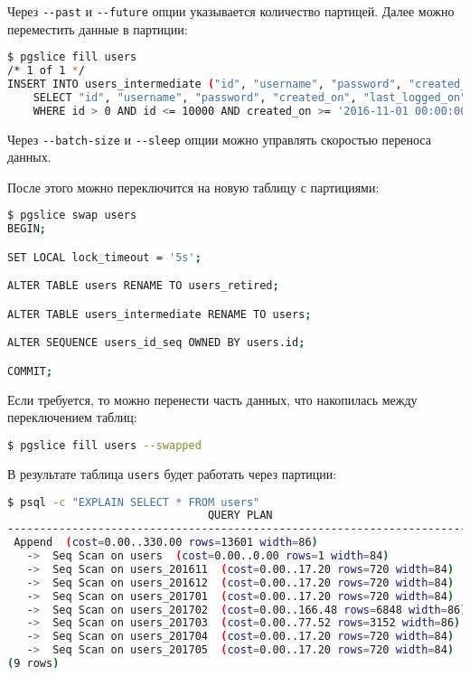 Через \lstinline!--past! и \lstinline!--future! опции указывается количество партицей. Далее можно переместить данные в партиции:

\begin{lstlisting}[language=Bash,label=lst:pgslice6,caption=Pgslice fill]
$ pgslice fill users
/* 1 of 1 */
INSERT INTO users_intermediate ("id", "username", "password", "created_on", "last_logged_on")
    SELECT "id", "username", "password", "created_on", "last_logged_on" FROM users
    WHERE id > 0 AND id <= 10000 AND created_on >= '2016-11-01 00:00:00 UTC'::timestamptz AND created_on < '2017-06-01 00:00:00 UTC'::timestamptz
\end{lstlisting}

Через \lstinline!--batch-size! и \lstinline!--sleep! опции можно управлять скоростью переноса данных.

После этого можно переключится на новую таблицу с партициями:

\begin{lstlisting}[language=Bash,label=lst:pgslice7,caption=Pgslice swap]
$ pgslice swap users
BEGIN;

SET LOCAL lock_timeout = '5s';

ALTER TABLE users RENAME TO users_retired;

ALTER TABLE users_intermediate RENAME TO users;

ALTER SEQUENCE users_id_seq OWNED BY users.id;

COMMIT;
\end{lstlisting}

Если требуется, то можно перенести часть данных, что накопилась между переключением таблиц:

\begin{lstlisting}[language=Bash,label=lst:pgslice8,caption=Pgslice fill]
$ pgslice fill users --swapped
\end{lstlisting}

В результате таблица \lstinline!users! будет работать через партиции:

\begin{lstlisting}[language=Bash,label=lst:pgslice_sample1,caption=Результат]
$ psql -c "EXPLAIN SELECT * FROM users"
                               QUERY PLAN
------------------------------------------------------------------------
 Append  (cost=0.00..330.00 rows=13601 width=86)
   ->  Seq Scan on users  (cost=0.00..0.00 rows=1 width=84)
   ->  Seq Scan on users_201611  (cost=0.00..17.20 rows=720 width=84)
   ->  Seq Scan on users_201612  (cost=0.00..17.20 rows=720 width=84)
   ->  Seq Scan on users_201701  (cost=0.00..17.20 rows=720 width=84)
   ->  Seq Scan on users_201702  (cost=0.00..166.48 rows=6848 width=86)
   ->  Seq Scan on users_201703  (cost=0.00..77.52 rows=3152 width=86)
   ->  Seq Scan on users_201704  (cost=0.00..17.20 rows=720 width=84)
   ->  Seq Scan on users_201705  (cost=0.00..17.20 rows=720 width=84)
(9 rows)
\end{lstlisting}

